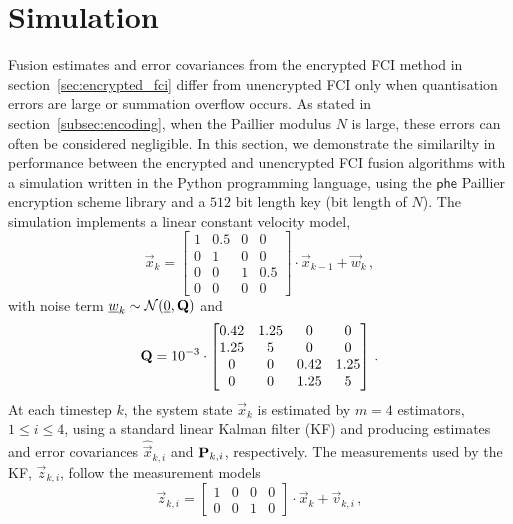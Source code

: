 \documentclass[letterpaper, 10 pt, conference]{ieeeconf}
\begin{document}
\section{Simulation}\label{sec:simulation}
Fusion estimates and error covariances from the encrypted FCI method in section~\ref{sec:encrypted_fci} differ from unencrypted FCI only when quantisation errors are large or summation overflow occurs. As stated in section~\ref{subsec:encoding}, when the Paillier modulus $N$ is large, these errors can often be considered negligible. In this section, we demonstrate the similarilty in performance between the encrypted and unencrypted FCI fusion algorithms with a simulation written in the Python programming language, using the $\mathsf{phe}$ Paillier encryption scheme library \cite{PythonPaillier2013} and a $512$ bit length key (bit length of $N$). The simulation implements a linear constant velocity model,
\begin{equation}\label{eqn:sim_sys_model}
    \vec{x}_k =
    \begin{bmatrix}
        1 & 0.5 & 0 & 0\\
        0 & 1 & 0 & 0\\
        0 & 0 & 1 & 0.5\\
        0 & 0 & 0 & 0
    \end{bmatrix}
    \cdot \vec{x}_{k-1} + \vec{w}_k\,,
\end{equation}
with noise term ${\underline{w}}_k \sim \mathcal{N}({\underline{0}}, {{\mathbf{Q}}})$ and
\begin{equation}
    {\ensuremath{{\mathbf{Q}}}} = 10^{-3} \cdot
    \begin{bmatrix}
        0.42 & 1.25 & 0 & 0\\
        1.25 & 5 & 0 & 0\\
        0 & 0 & 0.42 & 1.25\\
        0 & 0 & 1.25 & 5
    \end{bmatrix}\,.
\end{equation}
At each timestep $k$, the system state $\vec{x}_k$ is estimated by $m=4$ estimators, $1\leq i \leq 4$, using a standard linear Kalman filter (KF) \cite{haugBayesianEstimationTracking2012} and producing estimates and error covariances $\hat{\vec{x}}_{k,i}$ and ${{\mathbf{P}}}_{k,i}$, respectively. The measurements used by the KF, $\vec{z}_{k,i}$, follow the measurement models
\begin{equation}
    \vec{z}_{k,i} = 
    \begin{bmatrix}
        1 & 0 & 0 & 0\\
        0 & 0 & 1 & 0
    \end{bmatrix}
    \cdot \vec{x}_k + \vec{v}_{k,i}\,,
\end{equation}
\end{document}

